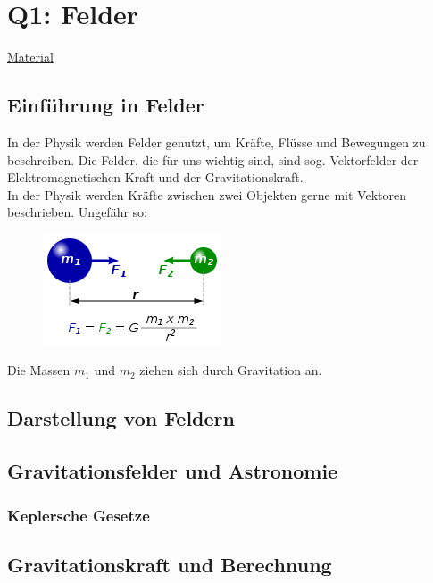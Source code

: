\documentclass{article}
\begin{document}
    \section{Q1: Felder}

        \href{https://gcm.schule/material/2023/physik/lk12/index_Q1.md}{Material}

        \subsection{Einführung in Felder}
            In der Physik werden Felder genutzt, um Kräfte, Flüsse und Bewegungen zu beschreiben.
            Die Felder, die für uns wichtig sind, sind sog. Vektorfelder der Elektromagnetischen Kraft
            und der Gravitationskraft. \\
            In der Physik werden Kräfte zwischen zwei Objekten gerne mit Vektoren beschrieben. Ungefähr so:
            \begin{figure}[h] \label{figure3: Gravitationskraft} \includegraphics{graphics/universalGravitation.png}\end{figure}   
            Die Massen $m_1$ und $ m_2 $ ziehen sich durch Gravitation an.
        \subsection{Darstellung von Feldern}

            

        \subsection{Gravitationsfelder und Astronomie}

            \subsubsection{Keplersche Gesetze}

            \subsection{Gravitationskraft und Berechnung}
\end{document}
